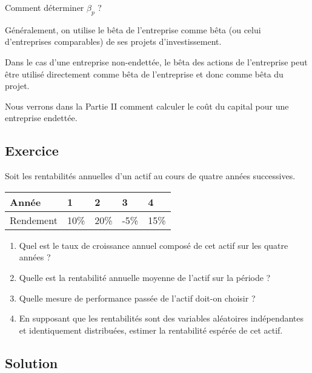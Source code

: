 \documentclass[a4paper, 12pt]{report}
\begin{document}
Comment déterminer $\beta_p$ ?

Généralement, on utilise le bêta de l'entreprise comme bêta (ou celui d'entreprises comparables) de ses projets d'investissement.

Dans le cas d'une entreprise non-endettée, le bêta des actions de l'entreprise peut être utilisé directement comme bêta de l'entreprise et donc comme bêta du projet.

Nous verrons dans la Partie II comment calculer le coût du capital pour une entreprise endettée.

\subsection{Exercice}

Soit les rentabilités annuelles d'un actif au cours de quatre années successives.

\begin{center}
	\begin{tabular}{@{}lllll@{}}
	\toprule
	Année     & 1    & 2    & 3    & 4    \\ \midrule
	Rendement & 10\% & 20\% & -5\% & 15\% \\ \bottomrule
\end{tabular}
\end{center}

\begin{enumerate}
	\item Quel est le taux de croissance annuel composé de cet actif sur les quatre années ?
	\item Quelle est la rentabilité annuelle moyenne de l’actif sur la période ?
	\item Quelle mesure de performance passée de l’actif doit-on choisir ?
	\item En supposant que les rentabilités sont des variables aléatoires indépendantes et identiquement distribuées, estimer la rentabilité espérée de  cet actif.
\end{enumerate}

\subsection{Solution}
\end{document}
